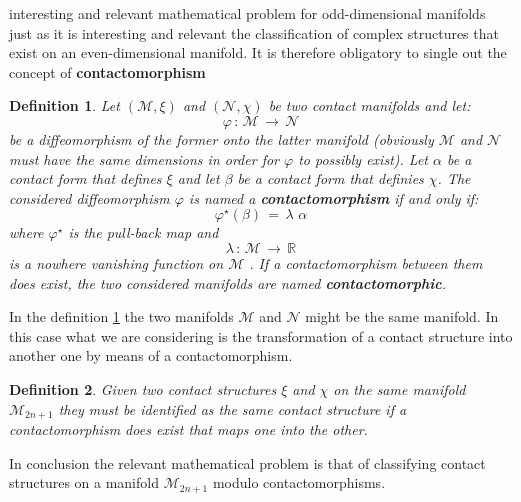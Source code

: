 \documentclass[10pt,a4paper]{article}
\newtheorem{definizione}{Definition}[section]
\begin{document}
interesting and relevant mathematical problem for odd-dimensional manifolds just as it is interesting and relevant the classification of  complex structures that  exist on an even-dimensional manifold.
It is therefore obligatory to single out the concept of
\textbf{contactomorphism}
\begin{definizione}
\label{cuntamorfa} Let $\left(\mathcal{ M},\xi\right)$ and
$\left(\mathcal{ N},\chi\right)$ be two contact manifolds and let:
\begin{equation}\label{diffeomorfus}
    \varphi \, : \, \mathcal{M} \, \longrightarrow \,\mathcal{N}
\end{equation}
be a diffeomorphism of the former  onto the latter manifold
(obviously  $\mathcal{M}$ and $\mathcal{N}$ must have the same dimensions
in order for $\varphi$ to possibly exist). Let
$\alpha$ be a contact form that defines $\xi$ and let $\beta$ be a contact form
that definies $\chi$. The considered  diffeomorphism
$\varphi $ is named a \textbf{contactomorphism}  if and only if:
\begin{equation}\label{pullabacco}
    \varphi^\star\left(\beta\right) \, = \, \lambda \, \, \alpha
\end{equation}
where $\varphi^\star$  is the pull-back map and
\begin{equation}\label{nowhere}
    \lambda \, : \, \mathcal{M} \, \longrightarrow \, \mathbb{R}
\end{equation}
is a nowhere vanishing function on $\mathcal{M}$ . If  a  contactomorphism between them does exist,
the two considered manifolds are named
\textbf{contactomorphic}.
\end{definizione}
In the definition \ref{cuntamorfa} the two manifolds $\mathcal{M}$ and
$\mathcal{N}$ might be the same manifold. In this case
what we are considering is the transformation of a contact structure into another one by means of a contactomorphism.
\begin{definizione}
\label{agignasco} Given two contact structures $\xi$ and $\chi$
on the same manifold $\mathcal{M}_{2n+1}$  they must be identified as the same contact structure   if
a  \textit{contactomorphism} does exist that maps one into the other.
\end{definizione}
In conclusion the relevant mathematical problem is that of
classifying contact structures on a manifold
$\mathcal{M}_{2n+1}$ modulo contactomorphisms.
\end{document}
